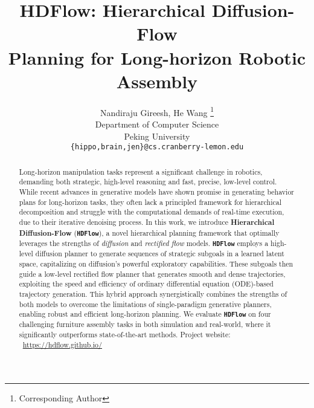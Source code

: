 \documentclass{article} %
\title{HDFlow: Hierarchical Diffusion-Flow \\ Planning for Long-horizon Robotic Assembly}
\author{Nandiraju Gireesh, He Wang \thanks{ Corresponding Author} \\
Department of Computer Science\\
Peking University \\
\texttt{\{hippo,brain,jen\}@cs.cranberry-lemon.edu} \\
}
\begin{document}
\maketitle

\begin{abstract}
Long-horizon manipulation tasks represent a significant challenge in robotics, demanding both strategic, high-level reasoning and fast, precise, low-level control. While recent advances in generative models have shown promise in generating behavior plans for long-horizon tasks, they often lack a principled framework for hierarchical decomposition and struggle with the computational demands of real-time execution, due to their iterative denoising process. In this work, we introduce \textbf{Hierarchical Diffusion-Flow} (\texttt{\textbf{HDFlow}}), a novel hierarchical planning framework that optimally leverages the strengths of \textit{diffusion} and \textit{rectified flow} models. \texttt{\textbf{HDFlow}} employs a high-level diffusion planner to generate sequences of strategic subgoals in a learned latent space, capitalizing on diffusion's powerful exploratory capabilities. These subgoals then guide a low-level rectified flow planner that generates smooth and dense trajectories, exploiting the speed and efficiency of ordinary differential equation (ODE)-based trajectory generation. This hybrid approach synergistically combines the strengths of both models to overcome the limitations of single-paradigm generative planners, enabling robust and efficient long-horizon planning. We evaluate \texttt{\textbf{HDFlow}} on four challenging furniture assembly tasks in both simulation and real-world, where it significantly outperforms state-of-the-art methods. Project website: ~\href{https://hdflow.github.io/}{https://hdflow.github.io/}
\end{abstract}
\vspace{-12pt}
\end{document}
